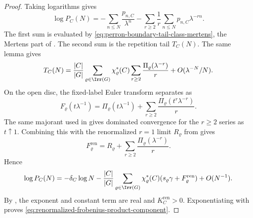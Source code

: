 \begin{proof}
  Taking logarithms gives
  \[
    \log P_C(N)
    =
    -\sum_{n\le N}\frac{p_{n,C}}{\lambda^n}
    -
    \sum_{r\ge2}\frac1r\sum_{n\le N}p_{n,C}\lambda^{-rn}.
  \]
  The first sum is evaluated by
  \eqref{eq:perron-boundary-tail-class-mertens}, the Mertens part of
  .  The second sum is the
  repetition tail \(T_C(N)\).  The same lemma gives
  \[
    T_C(N)
    =
    \frac{|C|}{|G|}
      \sum_{\varrho\in\Irr(G)}
        \chi_\varrho^\ast(C)
        \sum_{r\ge2}\frac{\Pi_\varrho(\lambda^{-r})}{r}
    +O(\lambda^{-N}/N).
  \]
  On the open disc, the fixed-label Euler transform separates as
  \[
    F_\varrho(t\lambda^{-1})
    =
    \Pi_\varrho(t\lambda^{-1})
    +
    \sum_{r\ge2}\frac{\Pi_\varrho(t^r\lambda^{-r})}{r}.
  \]
  The same majorant used in
   gives dominated
  convergence for the \(r\ge2\) series as \(t\uparrow1\).  Combining this
  with the renormalized \(r=1\) limit
  \(R_\varrho\) from
   gives
  \[
    F_\varrho^{\mathrm{ren}}
    =
    R_\varrho+
    \sum_{r\ge2}\frac{\Pi_\varrho(\lambda^{-r})}{r}.
  \]
  Hence
  \[
    \log P_C(N)
    =
    -\delta_C\log N
    -\frac{|C|}{|G|}
      \sum_{\varrho\in\Irr(G)}
        \chi_\varrho^\ast(C)
        (s_\varrho\gamma+F_\varrho^{\mathrm{ren}})
    +O(N^{-1}).
  \]
  By , the exponent and constant
  term are real and \(K_C^{\mathrm{ren}}>0\).  Exponentiating with
   proves
  \eqref{eq:renormalized-frobenius-product-component}.
\end{proof}

